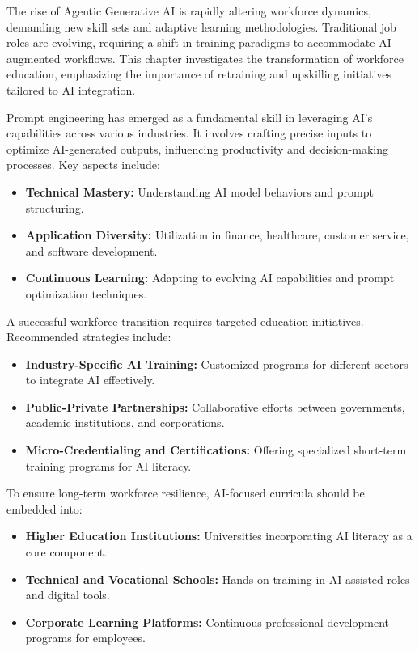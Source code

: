 \documentclass[a4paper,headinclude=on,footinclude=on,12pt,oneside]{scrbook}
\begin{document}

The rise of Agentic Generative AI is rapidly altering workforce dynamics, demanding new skill sets and adaptive learning methodologies. Traditional job roles are evolving, requiring a shift in training paradigms to accommodate AI-augmented workflows. This chapter investigates the transformation of workforce education, emphasizing the importance of retraining and upskilling initiatives tailored to AI integration.


Prompt engineering has emerged as a fundamental skill in leveraging AI’s capabilities across various industries. It involves crafting precise inputs to optimize AI-generated outputs, influencing productivity and decision-making processes. Key aspects include:
\begin{itemize}
	\item \textbf{Technical Mastery:} Understanding AI model behaviors and prompt structuring.
	\item \textbf{Application Diversity:} Utilization in finance, healthcare, customer service, and software development.
	\item \textbf{Continuous Learning:} Adapting to evolving AI capabilities and prompt optimization techniques.
\end{itemize}


A successful workforce transition requires targeted education initiatives. Recommended strategies include:
\begin{itemize}
	\item \textbf{Industry-Specific AI Training:} Customized programs for different sectors to integrate AI effectively.
	\item \textbf{Public-Private Partnerships:} Collaborative efforts between governments, academic institutions, and corporations.
	\item \textbf{Micro-Credentialing and Certifications:} Offering specialized short-term training programs for AI literacy.
\end{itemize}


To ensure long-term workforce resilience, AI-focused curricula should be embedded into:
\begin{itemize}
	\item \textbf{Higher Education Institutions:} Universities incorporating AI literacy as a core component.
	\item \textbf{Technical and Vocational Schools:} Hands-on training in AI-assisted roles and digital tools.
	\item \textbf{Corporate Learning Platforms:} Continuous professional development programs for employees.
\end{itemize}
\end{document}
